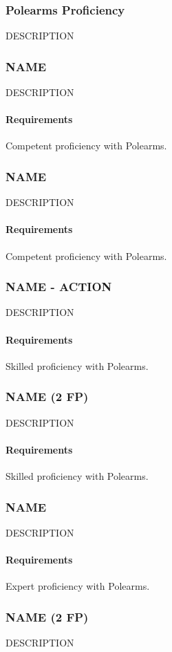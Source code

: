 \subsubsection{Polearms Proficiency} \label{feat::name}
    DESCRIPTION
\subsubsection{NAME} \label{feat::name}
    DESCRIPTION
    \paragraph{Requirements} Competent proficiency with Polearms.
\subsubsection{NAME} \label{feat::name}
    DESCRIPTION
    \paragraph{Requirements} Competent proficiency with Polearms.
\subsubsection{NAME - ACTION} \label{feat::name}
    DESCRIPTION
    \paragraph{Requirements} Skilled proficiency with Polearms.
\subsubsection{NAME (2 FP)} \label{feat::name}
    DESCRIPTION
    \paragraph{Requirements} Skilled proficiency with Polearms.
\subsubsection{NAME} \label{feat::name}
    DESCRIPTION
    \paragraph{Requirements} Expert proficiency with Polearms.
\subsubsection{NAME (2 FP)} \label{feat::name}
    DESCRIPTION
